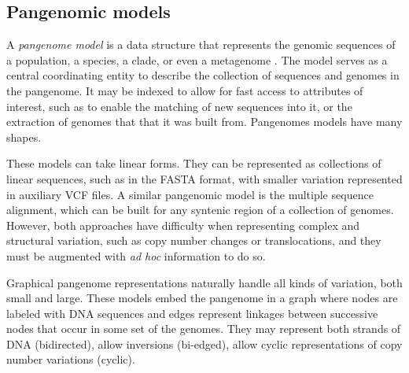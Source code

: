 
\subsection{Pangenomic models}

A \emph{pangenome model} is a data structure that represents the genomic sequences of a population, a species, a clade, or even a metagenome \cite{computational2016computational}.
The model serves as a central coordinating entity to describe the collection of sequences and genomes in the pangenome.
It may be indexed to allow for fast access to attributes of interest, such as to enable the matching of new sequences into it, or the extraction of genomes that that it was built from.
Pangenomes models have many shapes.

These models can take linear forms.
They can be represented as collections of linear sequences, such as in the FASTA format, with smaller variation represented in auxiliary VCF files.
A similar pangenomic model is the multiple sequence alignment, which can be built for any syntenic region of a collection of genomes.
However, both approaches have difficulty when representing complex and structural variation, such as copy number changes or translocations, and they must be augmented with \textit{ad hoc} information to do so.

Graphical pangenome representations naturally handle all kinds of variation, both small and large.
These models embed the pangenome in a graph where nodes are labeled with DNA sequences and edges represent linkages between successive nodes that occur in some set of the genomes.
They may represent both strands of DNA (bidirected), allow inversions (bi-edged), allow cyclic representations of copy number variations (cyclic).

